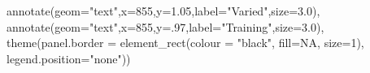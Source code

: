 \documentclass[
  letterpaper,
  DIV=11,
  numbers=noendperiod]{scrartcl}
\newenvironment{Shaded}{\begin{snugshade}}{\end{snugshade}}
\newcommand{\AttributeTok}[1]{\textcolor[rgb]{0.40,0.45,0.13}{#1}}
\newcommand{\ConstantTok}[1]{\textcolor[rgb]{0.56,0.35,0.01}{#1}}
\newcommand{\DecValTok}[1]{\textcolor[rgb]{0.68,0.00,0.00}{#1}}
\newcommand{\FloatTok}[1]{\textcolor[rgb]{0.68,0.00,0.00}{#1}}
\newcommand{\FunctionTok}[1]{\textcolor[rgb]{0.28,0.35,0.67}{#1}}
\newcommand{\NormalTok}[1]{\textcolor[rgb]{0.00,0.23,0.31}{#1}}
\newcommand{\StringTok}[1]{\textcolor[rgb]{0.13,0.47,0.30}{#1}}
\begin{document}
\begin{Shaded}
\begin{Highlighting}[]
                  \FunctionTok{annotate}\NormalTok{(}\AttributeTok{geom=}\StringTok{"text"}\NormalTok{,}\AttributeTok{x=}\DecValTok{855}\NormalTok{,}\AttributeTok{y=}\FloatTok{1.05}\NormalTok{,}\AttributeTok{label=}\StringTok{"Varied"}\NormalTok{,}\AttributeTok{size=}\FloatTok{3.0}\NormalTok{),}
                  \FunctionTok{annotate}\NormalTok{(}\AttributeTok{geom=}\StringTok{"text"}\NormalTok{,}\AttributeTok{x=}\DecValTok{855}\NormalTok{,}\AttributeTok{y=}\NormalTok{.}\DecValTok{97}\NormalTok{,}\AttributeTok{label=}\StringTok{"Training"}\NormalTok{,}\AttributeTok{size=}\FloatTok{3.0}\NormalTok{),}
                  \FunctionTok{theme}\NormalTok{(}\AttributeTok{panel.border =} \FunctionTok{element\_rect}\NormalTok{(}\AttributeTok{colour =} \StringTok{"black"}\NormalTok{, }\AttributeTok{fill=}\ConstantTok{NA}\NormalTok{, }\AttributeTok{size=}\DecValTok{1}\NormalTok{),}
                        \AttributeTok{legend.position=}\StringTok{"none"}\NormalTok{))}


\end{Highlighting}
\end{Shaded}
\end{document}
